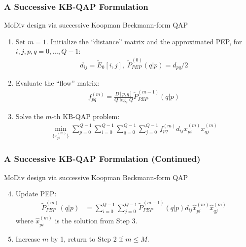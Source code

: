 \documentclass{beamer}
\begin{document}
\begin{frame}
  \frametitle{A Successive KB-QAP Formulation}
  \begin{block}{MoDiv design via successive Koopman Beckmann-form QAP}
    \begin{enumerate}[<+->]
      \item Set $m = 1$. Initialize the ``distance'' matrix and the approximated
      PEP, for $i,j,p,q=0,\ldots,Q-1$:
      \begin{align*}
        d_{ij} = \tilde{E}_0[i,j],\; \tilde{P}_{PEP}^{(0)}(q|p) = d_{pq}/2
      \end{align*}
      \item Evaluate the ``flow'' matrix:
      \begin{align*}
        f_{pq}^{(m)} = \frac{D[p,q]}{Q\log_2Q}\tilde{P}_{PEP}^{(m-1)}(q|p)
      \end{align*}
      \item Solve the $m$-th KB-QAP problem:
      \begin{align*}
        \min_{\{x_{pi}^{(m)}\}}
        \sum_{p=0}^{Q-1}\sum_{i=0}^{Q-1}
        \sum_{q=0}^{Q-1}\sum_{j=0}^{Q-1}
        f_{pq}^{(m)}d_{ij}x_{pi}^{(m)}x_{qj}^{(m)}
      \end{align*}
    \end{enumerate}
  \end{block}
\end{frame}

\begin{frame}
  \frametitle{A Successive KB-QAP Formulation (Continued)}
  \begin{block}{MoDiv design via successive Koopman Beckmann-form QAP}
    \begin{enumerate}[<+->]
      \setcounter{enumi}{3}
      \item Update PEP:
      \begin{align*}
        \tilde{P}_{PEP}^{(m)}(q|p) & = \sum_{i=0}^{Q-1}
        \sum_{j=0}^{Q-1}\tilde{P}_{PEP}^{(m
        - 1)}(q|p)d_{ij}\hat{x}_{pi}^{(m)}\hat{x}_{qj}^{(m)}
      \end{align*}
      where $\hat{x}_{pi}^{(m)}$ is the solution from Step 3.
      \item Increase $m$ by 1, return to Step 2 if $m \leq M$.
    \end{enumerate}
  \end{block}
  \vfill
\end{frame}
\end{document}
